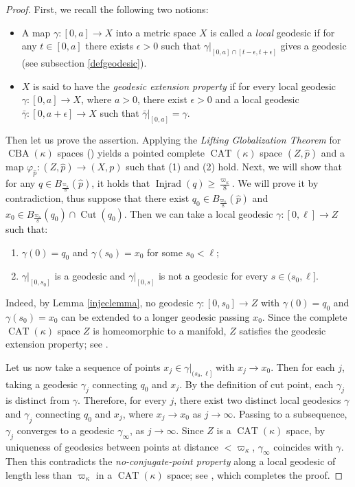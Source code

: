 \documentclass[11pt,reqno]{amsart}
\theoremstyle{definition}
\numberwithin{equation}{section}
\DeclareMathOperator{\CAT}{CAT}
\DeclareMathOperator{\CBA}{CBA}
\DeclareMathOperator{\Cut}{Cut}
\DeclareMathOperator{\Injrad}{Injrad}
\begin{document}
\begin{proof}
First, we recall the following two notions:
\begin{itemize}
    \item A map $\gamma:[0, a] \to X$ into a metric space $X$ is called a \textit{local} geodesic if for any $t \in [0, a]$ there exists $\epsilon>0$ such that $\gamma|_{[0,a]\cap [t-\epsilon, t+\epsilon]}$ gives a geodesic (see subsection \ref{defgeodesic}).
    \item $X$ is said to have the \textit{geodesic extension property} if for every local geodesic $\gamma:[0,a]\to X$, where $a>0$, there exist $\epsilon >0$ and a local geodesic $\bar{\gamma}:[0,a+\epsilon]\to X$ such that $\bar{\gamma}|_{[0,a]} = \gamma$.
\end{itemize}

Then let us prove the assertion.
 Applying the \textit{Lifting
Globalization Theorem} for $\CBA(\kappa)$ spaces (\cite[Theorem 9.50]{AKP-Alexandrov}) yields a pointed complete $\CAT(\kappa)$ space $(Z, \hat{p})$ and a map 
$\varphi_{\hat{p}}: (Z, \hat{p})  \to (X, p)$ such that (1) and (2) hold.  
Next, we will show that for any $q\in B_{\frac{\varpi_{\kappa}}{8}}(\hat{p})$, it holds that 
$
\Injrad(q) \geq \frac{\varpi_{\kappa}}{8}.
$
We will prove it by contradiction, thus suppose that there exist  $q_0 \in B_{\frac{\varpi_{\kappa}}{8}}(\hat{p})$ and $x_0 \in B_{\frac{\varpi_{\kappa}}{8}}(q_0)\cap \Cut(q_0)$.  Then we can take  a local geodesic $\gamma:[0,\ell] \to Z$ such that:
\begin{enumerate}
	\item $\gamma(0) = q_0$
and $\gamma(s_0) = x_0$ for some $s_0 < \ell$;
	\item $\gamma|_{[0,s_0]}$ is a geodesic and $\gamma|_{[0,s]}$ is not a geodesic for every $s \in (s_0, \ell]$.
\end{enumerate} 
 Indeed, by Lemma \ref{injeclemma}, no geodesic $\gamma:[0,s_0]\to Z$ with $\gamma(0)= q_0$ and $\gamma(s_0) = x_0$ can be extended to a longer geodesic passing $x_0$. Since the complete $\CAT(\kappa)$ space $Z$ is homeomorphic to a manifold, $Z$ satisfies the geodesic extension property; see \cite[Proposition II.5.12]{BH}. 
 
 Let us now take a sequence of points $x_j \in \gamma|_{(s_0,\ell]}$ with  $x_j \to x_0$. Then for each $j$, taking a geodesic $\gamma_j$ connecting $q_0$ and $x_j$. By the definition of cut point, each $\gamma_j$ is distinct from $\gamma$. Therefore, for every $j$, there exist two distinct local geodesics $\gamma$ and $\gamma_j$ connecting $q_0$ and $x_j$, where $x_j \to x_0$ as $j \to \infty$. Passing to a subsequence, $\gamma_j$ converges to a geodesic $\gamma_{\infty}$, as $j\to \infty$.  
Since $Z$ is a  $\CAT(\kappa)$ space, by uniqueness of   geodesics between points at distance $<\varpi_{\kappa}$,  $\gamma_{\infty}$ coincides with $\gamma$. Then this contradicts the \textit{no-conjugate-point property} along a local geodesic of length less than $\varpi_{\kappa}$ in a $\CAT(\kappa)$  space; see \cite[Theorem 9.46]{AKP-Alexandrov}, which completes the proof.
\end{proof}
\end{document}
